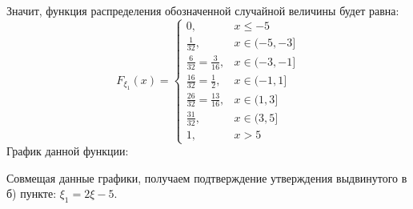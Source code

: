 \begin{exmp}
\begin{enumerate}
		Значит, функция распределения обозначенной случайной величины будет равна:
		\[
		F_{\xi_1}(x) = 
		\begin{cases}
		0, &x \le -5 \\
		\frac{1}{32}, &x \in (-5,-3] \\
		\frac{6}{32} = \frac{3}{16}, &x \in (-3,-1] \\
		\frac{16}{32} = \frac{1}{2}, &x \in (-1,1] \\
		\frac{26}{32} = \frac{13}{16}, &x \in (1,3] \\
		\frac{31}{32}, &x \in (3,5] \\
		1, &x > 5
		\end{cases}
		\]
		График данной функции:
		\begin{figure}[H]
		\end{figure}
		
		Совмещая данные графики, получаем подтверждение утверждения выдвинутого в б) пункте: $\xi_1 = 2\xi - 5$.
		\begin{figure}[H]
		\end{figure}
	\end{enumerate}
\end{exmp}
\newpage
